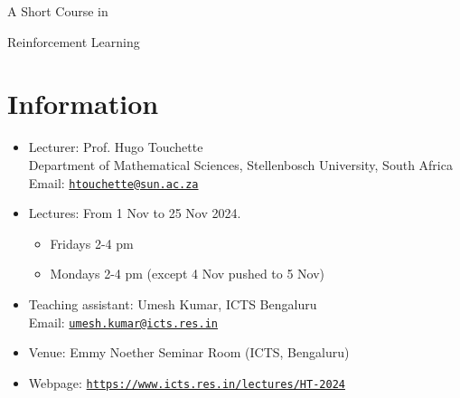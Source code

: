 \documentclass[11pt,a4paper]{article}
\begin{document}
\ddmmyyyydate
\graphicspath{{/Users/ht/Library/SUlogo/}}

\pagestyle{plain}

\vspace*{-0.7in}
\hfill{}%

\vspace*{-18mm}

{\huge
A Short Course in

\vspace*{1ex}

Reinforcement Learning\\
}

\vspace*{-7mm}

\section{Information}

\begin{itemize}
\item Lecturer: Prof. Hugo Touchette\\
Department of Mathematical Sciences, Stellenbosch University, South Africa\\
Email: \href{mailto:htouchette@sun.ac.za}{\texttt{htouchette@sun.ac.za}}

\item Lectures: From 1 Nov to 25 Nov 2024.
\begin{itemize}
\item Fridays 2-4 pm
\item Mondays 2-4 pm (except 4 Nov pushed to 5 Nov)
\end{itemize}

\item Teaching assistant: Umesh Kumar, ICTS Bengaluru\\
Email: \href{mailto:umesh.kumar@icts.res.in}{\texttt{umesh.kumar@icts.res.in}}

\item Venue: Emmy Noether Seminar Room (ICTS, Bengaluru)

\item Webpage: \href{https://www.icts.res.in/lectures/HT-2024}{\texttt{https://www.icts.res.in/lectures/HT-2024}}

\end{itemize}
\end{document}
